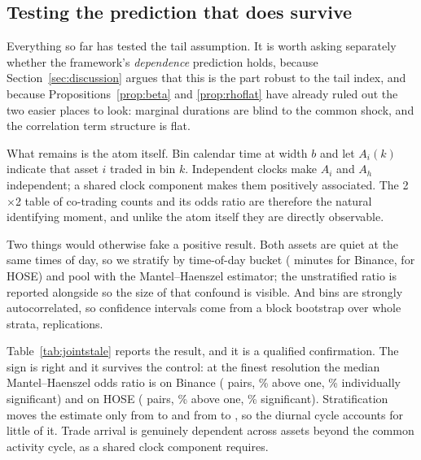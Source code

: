 \documentclass{ws-ijtaf}
\begin{document}
\subsection{Testing the prediction that does survive}\label{sec:jointstale}

Everything so far has tested the tail assumption. It is worth asking separately
whether the framework's \emph{dependence} prediction holds, because
Section~\ref{sec:discussion} argues that this is the part robust to the tail
index, and because Propositions~\ref{prop:beta} and \ref{prop:rhoflat} have
already ruled out the two easier places to look: marginal durations are blind to
the common shock, and the correlation term structure is flat.

What remains is the atom itself. Bin calendar time at width $b$ and let
$A_i(k)$ indicate that asset $i$ traded in bin $k$. Independent clocks make
$A_i$ and $A_h$ independent; a shared clock component makes them positively
associated. The 2$\times$2 table of co-trading counts and its odds ratio are
therefore the natural identifying moment, and unlike the atom itself they are
directly observable.

Two things would otherwise fake a positive result. Both assets are quiet at the
same times of day, so we stratify by time-of-day bucket (\jsStratumCrypto{}
minutes for Binance, \jsStratumHose{} for HOSE) and pool with the
Mantel--Haenszel estimator; the unstratified ratio is reported alongside so the
size of that confound is visible. And bins are strongly autocorrelated, so
confidence intervals come from a block bootstrap over whole strata,
\jsNboot{} replications.

\begin{table}[t]
{}
\label{tab:jointstale}
\end{table}

Table~\ref{tab:jointstale} reports the result, and it is a qualified
confirmation. The sign is right and it survives the control: at the finest
resolution the median Mantel--Haenszel odds ratio is \jsCryMH{} on Binance
(\jsCryPairs{} pairs, \jsCryAbove{}\% above one, \jsCrySig{}\% individually
significant) and \jsHosMH{} on HOSE (\jsHosPairs{} pairs, \jsHosAbove{}\% above
one, \jsHosSig{}\% significant). Stratification moves the estimate only from
\jsCryCrude{} to \jsCryMH{} and from \jsHosCrude{} to \jsHosMH{}, so the diurnal
cycle accounts for little of it. Trade arrival is genuinely dependent across
assets beyond the common activity cycle, as a shared clock component requires.
\end{document}
